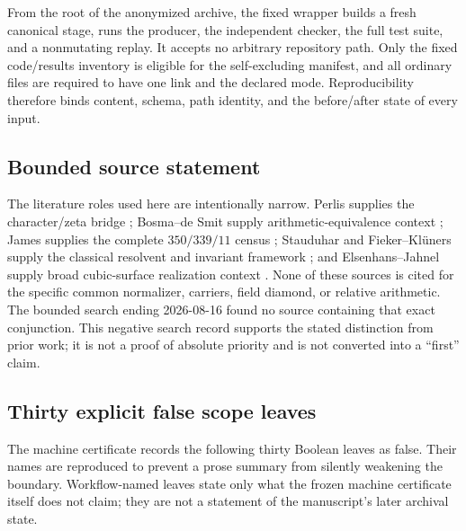 From the root of the anonymized archive, the fixed wrapper
 builds a fresh canonical stage, runs the producer,
the independent checker, the full test suite, and a nonmutating replay.  It
accepts no arbitrary repository path.  Only the fixed code/results inventory
is eligible for the self-excluding manifest, and all ordinary files are
required to have one link and the declared mode.  Reproducibility therefore
binds content, schema, path identity, and the before/after state of every
input.

\subsection{Bounded source statement}

The literature roles used here are intentionally narrow.  Perlis supplies
the character/zeta bridge \citep{perlis1977equation}; Bosma--de Smit supply
arithmetic-equivalence context \citep{bosmadesmit2002small}; James supplies
the complete $350/339/11$ census \citep{james2022bayesian}; Stauduhar and
Fieker--Kl\"uners supply the classical resolvent and invariant framework
\citep{stauduhar1973determination,fiekerklueners2014computation}; and
Elsenhans--Jahnel supply broad cubic-surface realization context
\citep{elsenhansjahnel2015moduli}.  None of these sources is cited for the
specific common normalizer, carriers, field diamond, or relative arithmetic.
The bounded search ending 2026-08-16 found no source containing that exact
conjunction.  This negative search record supports the stated distinction
from prior work; it is not a proof of absolute priority and is not converted
into a ``first'' claim.

\subsection{Thirty explicit false scope leaves}
\label{app:scope-leaves}

The machine certificate records the following thirty Boolean leaves as
false.  Their names are reproduced to prevent a prose summary from silently
weakening the boundary.  Workflow-named leaves state only what the frozen
machine certificate itself does not claim; they are not a statement of the
manuscript's later archival state.

